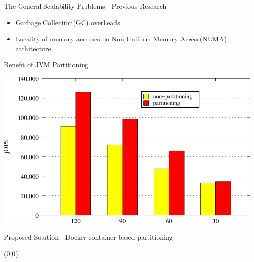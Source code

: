 \documentclass[english]{beamer} %
\begin{document}
\begin{frame}{The General Scalability Problems - Previous Research}
    \begin{itemize}[<+-| alert@+>]
    \item Garbage Collection(GC) overheads.
    \item Locality of memory accesses on Non-Uniform Memory Access(NUMA)
    architecture.
    \end{itemize}
\end{frame}



\begin{frame}{Benefit of JVM Partitioning}
\begin{center}
\includegraphics[scale=0.9]{graph/SPECjbb2013}
\end{center}
\end{frame}

\begin{frame}{Proposed Solution - Docker container-based partitioning}
\begin{textblock}{1}(0,0)
\end{textblock} 
\end{frame}
\end{document}
